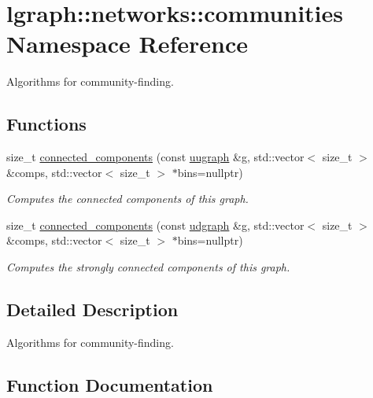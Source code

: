 \hypertarget{namespacelgraph_1_1networks_1_1communities}{}\section{lgraph\+:\+:networks\+:\+:communities Namespace Reference}
\label{namespacelgraph_1_1networks_1_1communities}


Algorithms for community-\/finding.  


\subsection*{Functions}
\begin{DoxyCompactItemize}
\item 
size\+\_\+t \hyperlink{namespacelgraph_1_1networks_1_1communities_a3d10fc5364fef994e881117c376e3513}{connected\+\_\+components} (const \hyperlink{classlgraph_1_1uugraph}{uugraph} \&g, std\+::vector$<$ size\+\_\+t $>$ \&comps, std\+::vector$<$ size\+\_\+t $>$ $\ast$bins=nullptr)
\begin{DoxyCompactList}\small\item\em Computes the connected components of this graph. \end{DoxyCompactList}\item 
size\+\_\+t \hyperlink{namespacelgraph_1_1networks_1_1communities_acd8a141ca593aee59fee06d4657c902a}{connected\+\_\+components} (const \hyperlink{classlgraph_1_1udgraph}{udgraph} \&g, std\+::vector$<$ size\+\_\+t $>$ \&comps, std\+::vector$<$ size\+\_\+t $>$ $\ast$bins=nullptr)
\begin{DoxyCompactList}\small\item\em Computes the strongly connected components of this graph. \end{DoxyCompactList}\end{DoxyCompactItemize}


\subsection{Detailed Description}
Algorithms for community-\/finding. 

\subsection{Function Documentation}
\mbox{\label{namespacelgraph_1_1networks_1_1communities_a3d10fc5364fef994e881117c376e3513}} 
